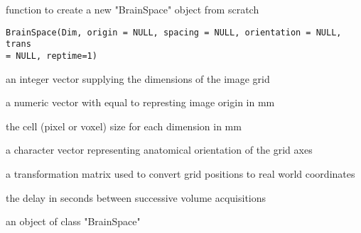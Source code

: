 \begin{Description}\relax
function to create a new "BrainSpace" object from scratch
\end{Description}
\begin{Usage}
\begin{verbatim}
BrainSpace(Dim, origin = NULL, spacing = NULL, orientation = NULL, trans
= NULL, reptime=1)
\end{verbatim}
\end{Usage}
\begin{Arguments}
\begin{ldescription}
\item[\code{Dim}] an integer vector supplying the dimensions of the image
grid  
\item[\code{origin}] a numeric vector with  equal to 
represting image origin in mm 
\item[\code{spacing}] the cell (pixel or voxel) size for each dimension in mm 
\item[\code{orientation}] a character vector representing anatomical
orientation of the grid axes  
\item[\code{trans}] a transformation matrix used to convert grid positions
to real world coordinates 
\item[\code{reptime}] the delay in seconds between successive volume acquisitions 
\end{ldescription}
\end{Arguments}
\begin{Value}
an object of class "BrainSpace"
\end{Value}


